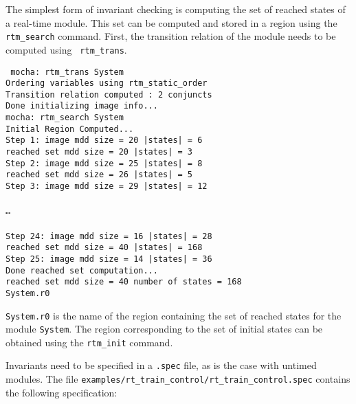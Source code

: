 The simplest form of invariant checking is computing the set of
reached states of a real-time module. This set can be computed and
stored in a region using the {\tt rtm\_search} command. First, the
transition relation of the module needs to be computed using {\tt
rtm\_trans}. 

\mypar
{\tt
mocha: rtm\_trans System \\
Ordering variables using rtm\_static\_order \\
Transition relation computed : 2 conjuncts \\
Done initializing image info... \\
mocha: rtm\_search System \\
Initial Region Computed... \\
Step 1: image mdd size =         20      |states| =        6    \\
reached set mdd size =         20        |states| =        3    \\
Step 2: image mdd size =         25      |states| =        8    \\
reached set mdd size =         26        |states| =        5    \\
Step 3: image mdd size =         29      |states| =       12    \\      
\\
\ldots\\
\\
Step 24: image mdd size =         16     |states| =       28    \\
reached set mdd size =         40        |states| =      168    \\
Step 25: image mdd size =         14     |states| =       36    \\      
Done reached set computation...                                 \\
reached set mdd size =         40        number of states =      168    \\
System.r0    \\
}

\noindent
{\tt System.r0} is the name of the region containing the set
of reached states for the module {\tt System}. The region
corresponding to the set of initial states can be obtained using the
{\tt rtm\_init} command.

Invariants need to be specified in a {\tt .spec} file, as is the case
with untimed modules. The file {\tt examples/rt\_train\_control/rt\_train\_control.spec}
contains the following specification:

